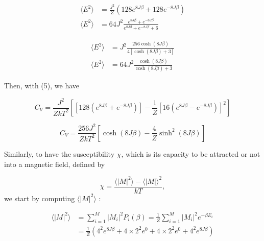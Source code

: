 \documentclass[a4paper, twoside, 11pt]{report}
\theoremstyle{theorem}
\theoremstyle{remark}
\theoremstyle{exemple}
\begin{document}
                \begin{align*}
                    \langle E^2 \rangle &= \frac{J^2}{Z}\left(128e^{8J\beta} + 128e^{-8J\beta}\right) \tag{7} \\
                    \langle E^2 \rangle &= 64J^2 \frac{e^{8J\beta} + e^{-8J\beta}}{e^{8J\beta} + e^{-8J\beta} + 6}
                \end{align*}
                
                \begin{align*}
                    \langle E^2 \rangle &= J^2 \frac{256\cosh(8J\beta)}{4[\cosh(8J\beta) + 3]}\\
                    \langle E^2 \rangle &= 64J^2 \frac{\cosh(8J\beta)}{\cosh(8J\beta) +3} \tag{7'}
                \end{align*}
            
            Then, with (5), we have
            
                \begin{equation*}
                    C_V = \frac{J^2}{ZkT^2}\left[\left[128\left(e^{8J\beta} + e^{-8J\beta}\right)\right] - \frac{1}{Z}\left[16\left(e^{8J\beta}-e^{-8J\beta}\right)\right]^2\right]   
                \end{equation*}
                
                \begin{equation*}
                    C_V = \frac{256J^2}{ZkT^2}\left[\cosh(8J\beta) - \frac{4}{Z}\sinh^2(8J\beta)\right]
                    \tag{8}
                \end{equation*}
                
            Similarly, to have the susceptibility $\chi$, which is its capacity to be attracted or not into a magnetic field, defined by
            
                \begin{equation*}
                    \chi = \frac{\langle |M|^2 \rangle - \langle |M| \rangle ^2}{kT},
                \end{equation*}
            we start by computing $\langle |M|^2 \rangle$ :
            
                \begin{align*}
                    \langle |M|^2 \rangle &= \sum\limits_{i=1}^{M} |M_i|^2P_i(\beta) = \frac{1}{Z}\sum\limits_{i=1}^{M}|M_i|^2 e^{-\beta E_i} \\
                    &= \frac{1}{Z}\left(4^2e^{8J\beta} + 4 \times 2^2 e^{0} + 4 \times 2^2 e^{0} + 4^2e^{8J\beta}\right) 
                \end{align*}
                
\end{document}
